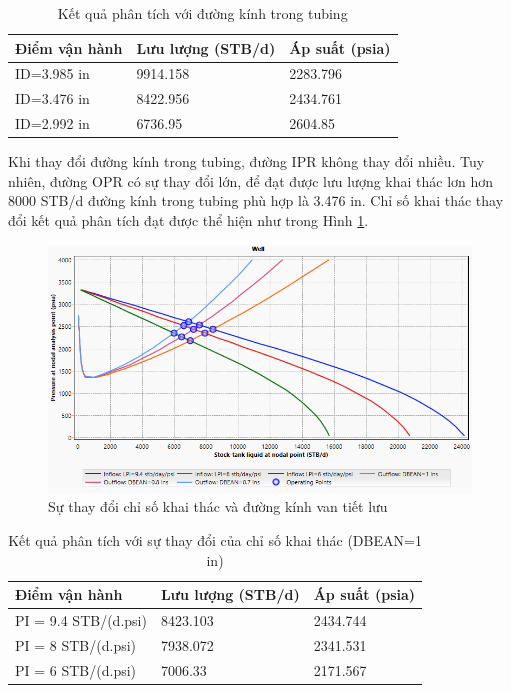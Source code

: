 \documentclass[12pt,a4paper]{report}
\begin{document}
\begin{table}[h]
\caption{Kết quả phân tích với đường kính trong tubing}\label{tab:tubing_vs_static_press_result}
\begin{tabularx}{\textwidth}{@{}XXX@{}}
\toprule
Điểm vận hành & Lưu lượng (STB/d) & Áp suất (psia) \\ \midrule
ID=3.985 in   & 9914.158          & 2283.796       \\
ID=3.476 in   & 8422.956          & 2434.761       \\
ID=2.992 in   & 6736.95           & 2604.85        \\ \bottomrule
\end{tabularx}
\end{table}
Khi thay đổi đường kính trong tubing, đường IPR không thay đổi nhiều. Tuy nhiên, đường OPR có sự thay đổi lớn, để đạt được lưu lượng khai thác lơn hơn 8000 STB/d đường kính trong tubing phù hợp là 3.476 in.
\newpage
Chỉ số khai thác thay đổi kết quả phân tích đạt được thể hiện như trong Hình \ref{fig:pi_vs_choke}.
	\begin{figure}[h]
		\centering
		\includegraphics[scale=0.75]{Fig/pi_vs_choke.PNG}
		\caption{Sự thay đổi chỉ số khai thác và đường kính van tiết lưu}
		\label{fig:pi_vs_choke}
	\end{figure}
\begin{table}[h]
\caption{Kết quả phân tích với sự thay đổi của chỉ số khai thác (DBEAN=1 in)}\label{tab:pi_vs_choke_result}
\begin{tabularx}{\textwidth}{@{}XXX@{}}
\toprule
Điểm vận hành          & Lưu lượng (STB/d) & Áp suất (psia) \\ \midrule
PI = 9.4 STB/(d.psi)  & 8423.103          & 2434.744       \\
PI = 8 STB/(d.psi)    & 7938.072          & 2341.531       \\
PI = 6 STB/(d.psi)    & 7006.33           & 2171.567       \\ \bottomrule
\end{tabularx}
\end{table}
\end{document}
